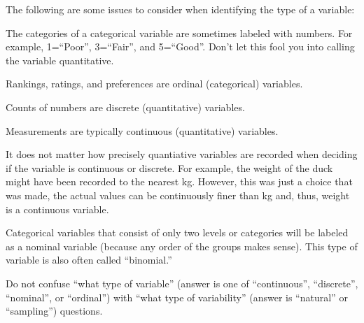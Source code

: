 \documentclass[10pt,openany]{book}\usepackage[]{graphicx}\usepackage[]{color}
\begin{document}
The following are some issues to consider when identifying the type of a variable:
\begin{Enumerate}
  \item The categories of a categorical variable are sometimes labeled with numbers. For example, 1=``Poor'', 3=``Fair'', and 5=``Good''. Don't let this fool you into calling the variable quantitative.
  \item Rankings, ratings, and preferences are ordinal (categorical) variables.
  \item Counts of numbers are discrete (quantitative) variables.
  \item Measurements are typically continuous (quantitative) variables.
  \item It does not matter how precisely quantiative variables are recorded when deciding if the variable is continuous or discrete. For example, the weight of the duck might have been recorded to the nearest kg. However, this was just a choice that was made, the actual values can be continuously finer than kg and, thus, weight is a continuous variable.
  \item Categorical variables that consist of only two levels or categories will be labeled as a nominal variable (because any order of the groups makes sense). This type of variable is also often called ``binomial.''
  \item Do not confuse ``what type of variable'' (answer is one of ``continuous'', ``discrete'', ``nominal'', or ``ordinal'')  with ``what type of variability'' (answer is ``natural'' or ``sampling'') questions.
\end{Enumerate}


\vspace{-12pt}
\end{document}
